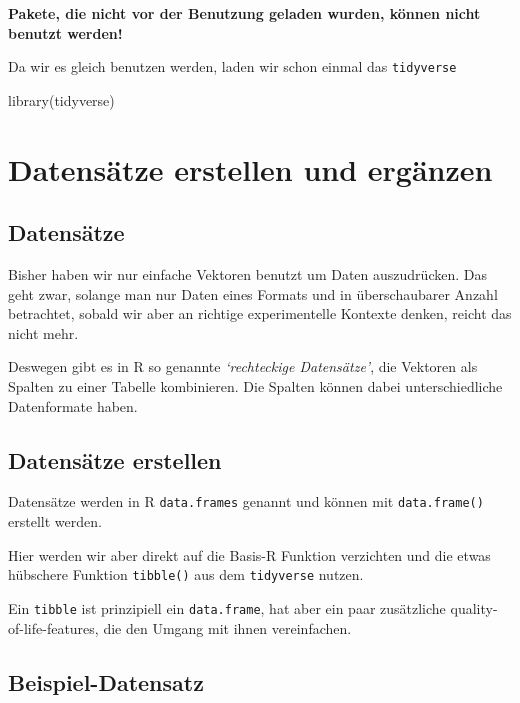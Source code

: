 \documentclass[
]{book}
\newenvironment{Shaded}{\begin{snugshade}}{\end{snugshade}}
\newcommand{\FunctionTok}[1]{\textcolor[rgb]{0.00,0.00,0.00}{#1}}
\newcommand{\NormalTok}[1]{#1}
\begin{document}
\textbf{Pakete, die nicht vor der Benutzung geladen wurden, können nicht benutzt werden!}

Da wir es gleich benutzen werden, laden wir schon einmal das \texttt{tidyverse}

\begin{Shaded}
\begin{Highlighting}[]
\FunctionTok{library}\NormalTok{(tidyverse)}
\end{Highlighting}
\end{Shaded}

\hypertarget{datensuxe4tze-erstellen-und-erguxe4nzen}{%
\section{Datensätze erstellen und ergänzen}\label{datensuxe4tze-erstellen-und-erguxe4nzen}}

\hypertarget{datensuxe4tze}{%
\subsection{Datensätze}\label{datensuxe4tze}}

Bisher haben wir nur einfache Vektoren benutzt um Daten auszudrücken. Das geht zwar, solange man nur Daten eines Formats und in überschaubarer Anzahl betrachtet, sobald wir aber an richtige experimentelle Kontexte denken, reicht das nicht mehr.

Deswegen gibt es in R so genannte \emph{`rechteckige Datensätze'}, die Vektoren als Spalten zu einer Tabelle kombinieren. Die Spalten können dabei unterschiedliche Datenformate haben.

\hypertarget{datensuxe4tze-erstellen}{%
\subsection{Datensätze erstellen}\label{datensuxe4tze-erstellen}}

Datensätze werden in R \texttt{data.frames} genannt und können mit \texttt{data.frame()} erstellt werden.

Hier werden wir aber direkt auf die Basis-R Funktion verzichten und die etwas hübschere Funktion \texttt{tibble()} aus dem \texttt{tidyverse} nutzen.

Ein \texttt{tibble} ist prinzipiell ein \texttt{data.frame}, hat aber ein paar zusätzliche quality-of-life-features, die den Umgang mit ihnen vereinfachen.

\hypertarget{beispiel-datensatz}{%
\subsection{Beispiel-Datensatz}\label{beispiel-datensatz}}
\end{document}
